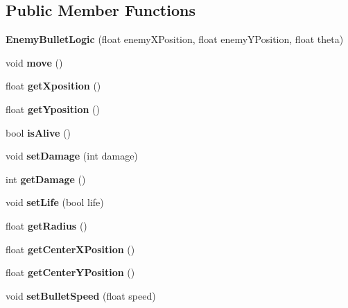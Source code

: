 \subsection*{Public Member Functions}
\begin{DoxyCompactItemize}
\item 
\mbox{\label{class_enemy_bullet_logic_a8f9f29a7c39830ccffc793adecf70c0e}} 
{\bfseries Enemy\+Bullet\+Logic} (float enemy\+X\+Position, float enemy\+Y\+Position, float theta)
\item 
\mbox{\label{class_enemy_bullet_logic_aaa5273b969347ce8c6e62261ccc3df3a}} 
void {\bfseries move} ()
\item 
\mbox{\label{class_enemy_bullet_logic_afe73016d27c33171a20c15e11026106e}} 
float {\bfseries get\+Xposition} ()
\item 
\mbox{\label{class_enemy_bullet_logic_a0cfb3013a7613f7f6de91a6db04d03b1}} 
float {\bfseries get\+Yposition} ()
\item 
\mbox{\label{class_enemy_bullet_logic_a42d10bdfde42178e272997de9b387398}} 
bool {\bfseries is\+Alive} ()
\item 
\mbox{\label{class_enemy_bullet_logic_a3e4ce40e06e9fa23826bd74015fd75f2}} 
void {\bfseries set\+Damage} (int damage)
\item 
\mbox{\label{class_enemy_bullet_logic_a08dd084364fc7efc689a7f98e1cee688}} 
int {\bfseries get\+Damage} ()
\item 
\mbox{\label{class_enemy_bullet_logic_a92e4dfb6a528114ad58f9ae64924fbab}} 
void {\bfseries set\+Life} (bool life)
\item 
\mbox{\label{class_enemy_bullet_logic_a7e473b13bf07fdf8eb76b65e02879bf7}} 
float {\bfseries get\+Radius} ()
\item 
\mbox{\label{class_enemy_bullet_logic_a39ffa8b7fabb84625a859691099652de}} 
float {\bfseries get\+Center\+X\+Position} ()
\item 
\mbox{\label{class_enemy_bullet_logic_a4c006085f2a11f68e8043bca67d3effe}} 
float {\bfseries get\+Center\+Y\+Position} ()
\item 
\mbox{\label{class_enemy_bullet_logic_a0263d2207f0d4332efa2cf8f8bbdc42c}} 
void {\bfseries set\+Bullet\+Speed} (float speed)
\end{DoxyCompactItemize}


